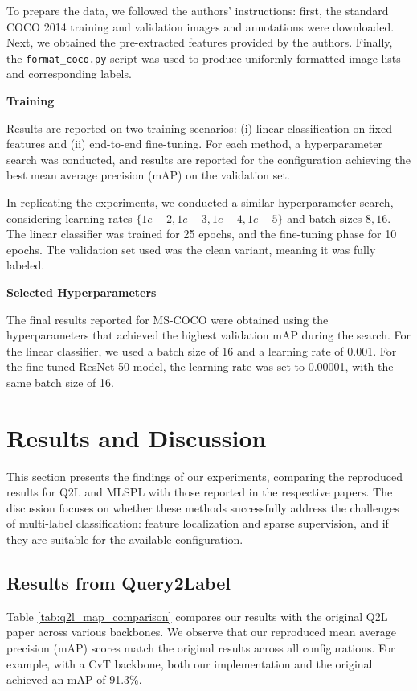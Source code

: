 \documentclass[lettersize,journal]{IEEEtran}
\renewcommand{\paragraph}[1]{%
  \vspace{1.5ex}\textbf{#1}\quad
}
\begin{document}
To prepare the data, we followed the authors' instructions: first, the standard COCO 2014 training and validation images and annotations were downloaded. Next, we obtained the pre-extracted features provided by the authors. Finally, the \texttt{format\_coco.py} script was used to produce uniformly formatted image lists and corresponding labels.


\paragraph{Training}
Results are reported on two training scenarios: (i) linear classification on fixed features and (ii) end-to-end fine-tuning. For each method, a hyperparameter search was conducted, and results are reported for the configuration achieving the best mean average precision (mAP) on the validation set.

In replicating the experiments, we conducted a similar hyperparameter search, considering learning rates  $\{1e-2, 1e-3, 1e-4, 1e-5\}$ and batch sizes ${8, 16}$. The linear classifier was trained for 25 epochs, and the fine-tuning phase for 10 epochs. The validation set used was the clean variant, meaning it was fully labeled.

\paragraph{Selected Hyperparameters}
The final results reported for MS-COCO were obtained using the hyperparameters that achieved the highest validation mAP during the search. For the linear classifier, we used a batch size of 16 and a learning rate of 0.001. For the fine-tuned ResNet-50 model, the learning rate was set to 0.00001, with the same batch size of 16.


\section{Results and Discussion}
\label{sec:results}
This section presents the findings of our experiments, comparing the reproduced results for Q2L and MLSPL with those reported in the respective papers. The discussion focuses on whether these methods successfully address the challenges of multi-label classification: feature localization and sparse supervision, and if they are suitable for the available configuration.

\subsection{Results from Query2Label}
Table \ref{tab:q2l_map_comparison} compares our results with the original Q2L paper across various backbones. We observe that our reproduced mean average precision (mAP) scores match the original results across all configurations. For example, with a CvT backbone, both our implementation and the original achieved an mAP of 91.3\%.
\end{document}
